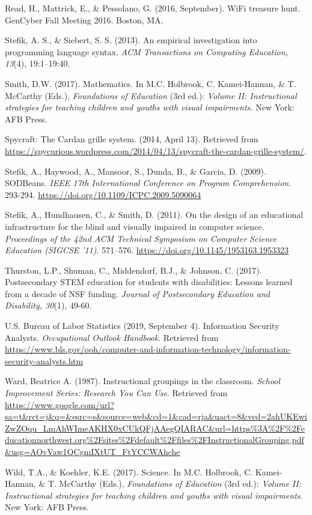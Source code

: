 \documentclass[11.5pt]{sig-alternate} %
\begin{document}
\begin{hangparas}{0.25in}{1}
Read, H., Mattrick, E., \& Pessolano, G. (2016, September). WiFi treasure hunt. GenCyber Fall Meeting 2016. Boston, MA.

Stefik, A. S., \& Siebert, S. S. (2013). An empirical investigation into programming language syntax. \textit{ACM Transactions on Computing Education, 13}(4), 19:1–19:40.

Smith, D.W. (2017). Mathematics. In M.C. Holbrook, C. Kamei-Hannan, \& T. McCarthy (Eds.), \textit{Foundations of Education} (3rd ed.): \textit{Volume II: Instructional strategies for teaching children and youths with visual impairments.} New York: AFB Press.

Spycraft: The Cardan grille system. (2014, April 13). Retrieved from \url{https://spycurious.wordpress.com/2014/04/13/spycraft-the-cardan-grille-system/}.

Stefik, A., Haywood, A., Mansoor, S., Dunda, B., \& Garcia, D. (2009). SODBeans. \textit{IEEE 17th International Conference on Program Comprehension.} 293-294. \url{https://doi.org/10.1109/ICPC.2009.5090064}

Stefik, A., Hundhausen, C., \& Smith, D. (2011). On the design of an educational infrastructure for the blind and visually impaired in computer science. \textit{Proceedings of the 42nd ACM Technical Symposium on Computer Science Education (SIGCSE ’11)}. 571–576. \url{https://doi.org/10.1145/1953163.1953323}

Thurston, L.P., Shuman, C., Middendorf, B.J., \& Johnson, C. (2017). Postsecondary STEM education for students with disabilities: Lessons learned from a decade of NSF funding. \textit{Journal of Postsecondary Education and Disability, 30}(1), 49-60. 

U.S. Bureau of Labor Statistics (2019, September 4). Information Security Analysts. \textit{Occupational Outlook Handbook}. Retrieved from \url{https://www.bls.gov/ooh/computer-and-information-technology/information-security-analysts.htm}

Ward, Beatrice A. (1987). Instructional groupings in the classroom. \textit{School Improvement Series: Research You Can Use}. Retrieved from \url{https://www.google.com/url?sa=t\&rct=j\&q=\&esrc=s\&source=web\&cd=1\&cad=rja\&uact=8\&ved=2ahUKEwiZwZOqu_LmAhWImeAKHX0xCUkQFjAAegQIARAC\&url=https\%3A\%2F\%2Feducationnorthwest.org\%2Fsites\%2Fdefault\%2Ffiles\%2FInstructionalGrouping.pdf\&usg=AOvVaw1QCgmIXtUT_FtYCCWAhche} 

Wild, T.A., \& Koehler, K.E. (2017). Science. In M.C. Holbrook, C. Kamei-Hannan, \& T. McCarthy (Eds.), \textit{Foundations of Education} (3rd ed.): \textit{Volume II: Instructional strategies for teaching children and youths with visual impairments}. New York: AFB Press.

\end{hangparas}
\end{document}
